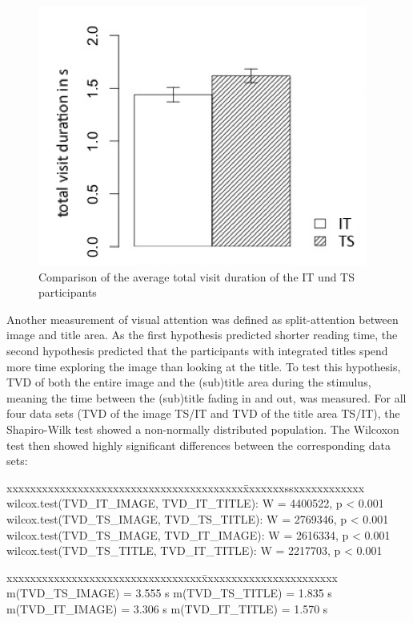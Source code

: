 \documentclass[output=paper]{langsci/langscibook}
\begin{document}
\begin{figure} 
  \includegraphics[height=.3\textheight]{figures/Fox6.png}
  \caption{Comparison of the average total visit duration of the IT und TS participants}
  \label{fox:fig:6}
\end{figure}


Another measurement of visual attention was defined as split-attention between image and title area. As the first hypothesis predicted shorter reading time, the second hypothesis predicted that the participants with integrated titles spend more time exploring the image than looking at the title. To test this hypothesis, TVD of both the entire image and the (sub)title area during the stimulus, meaning the time between the (sub)title fading in and out, was measured. For all four data sets (TVD of the image TS/IT and TVD of the title area TS/IT), the Shapiro-Wilk test showed a non-normally distributed population. The Wilcoxon test then showed highly significant differences between the corresponding data sets:


\ea
\begin{tabbing}
xxxxxxxxxxxxxxxxxxxxxxxxxxxxxxxxxxxxxxxx\=xxxxxxxssxxxxxxxxxxxx\kill
wilcox.test(TVD\_IT\_IMAGE, TVD\_IT\_TITLE): \>		W = 4400522, p < 0.001\\
wilcox.test(TVD\_TS\_IMAGE, TVD\_TS\_TITLE): \>		W = 2769346, p < 0.001\\
wilcox.test(TVD\_TS\_IMAGE, TVD\_IT\_IMAGE): \>		W = 2616334, p < 0.001\\
wilcox.test(TVD\_TS\_TITLE, TVD\_IT\_TITLE): \>		W = 2217703, p < 0.001
\end{tabbing}
\begin{tabbing}
xxxxxxxxxxxxxxxxxxxxxxxxxxxxxxxxx\=xxxxxxxxxxxxxxxxxxxxxxx\kill
m(TVD\_TS\_IMAGE) = 3.555 s	\>	m(TVD\_TS\_TITLE) = 1.835 s\\
m(TVD\_IT\_IMAGE) = 3.306 s	\>	m(TVD\_IT\_TITLE) = 1.570 s
\end{tabbing}
\z
\end{document}
